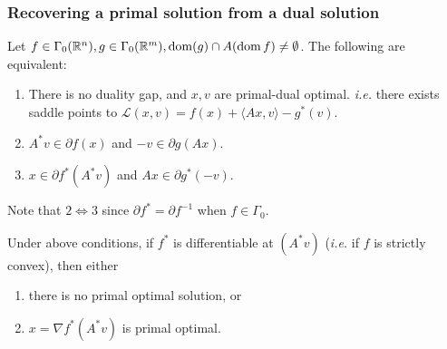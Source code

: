 \documentclass[class=article,crop=false]{standalone}
\begin{document}
\subsubsection{Recovering a primal solution from a dual solution}
\begin{thm}[BC17 19.1]
	Let $ f \in \Gamma_0(\mathbb{R}^{n}), g \in \Gamma_0(\mathbb{R}^{m}), \operatorname{dom}(g) \cap A(\operatorname{dom} f) \neq \emptyset$. The following are equivalent:
	\begin{enumerate}[label=(\arabic*)]
		\item There is no duality gap, and $ x,v$ are primal-dual optimal.  \emph{i.e.} there exists saddle points to $ \mathscr{L}(x,v)=f(x) + \langle Ax,v \rangle - g^* (v)$.
		\item $ A^* v \in \partial f(x)$ and $ -v \in \partial g(Ax)$.
		\item $ x \in \partial f^* (A^* v)$ and $ Ax \in \partial g^* (-v)$.
	\end{enumerate}
\end{thm}
Note that $ 2 \iff 3$ since $ \partial f^* = \partial f^{-1}$ when $ f \in \Gamma_0$.
\begin{prop}[BC17 19.4]
	Under above conditions, if $ f^* $ is differentiable at $ (A^* v)$ (\emph{i.e.} if $ f$ is strictly convex), then either
	\begin{enumerate}[label=(\alph*)]
		\item there is no primal optimal solution, or
		\item $ x = \nabla f^* (A^* v)$ is primal optimal.
	\end{enumerate}
\end{prop}
\end{document}
